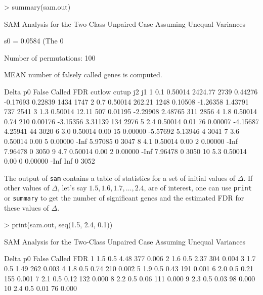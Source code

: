 \documentclass[a4paper]{article}
\begin{document}
\begin{Schunk}
\begin{Sinput}
> summary(sam.out)
\end{Sinput}
\begin{Soutput}
SAM Analysis for the Two-Class Unpaired Case Assuming Unequal Variances 
 
 s0 = 0.0584  (The 0 %
 
 Number of permutations: 100  

 MEAN number of falsely called genes is computed.

   Delta      p0   False Called     FDR   cutlow   cutup   j2   j1
1    0.1 0.50014 2424.77   2739 0.44276 -0.17693 0.22839 1434 1747
2    0.7 0.50014  262.21   1248 0.10508 -1.26358 1.43791  737 2541
3    1.3 0.50014   12.11    507 0.01195 -2.29908 2.48765  311 2856
4    1.8 0.50014    0.74    210 0.00176 -3.15356 3.31139  134 2976
5    2.4 0.50014    0.01     76 0.00007 -4.15687 4.25941   44 3020
6    3.0 0.50014    0.00     15 0.00000 -5.57692 5.13946    4 3041
7    3.6 0.50014    0.00      5 0.00000     -Inf 5.97085    0 3047
8    4.1 0.50014    0.00      2 0.00000     -Inf 7.96478    0 3050
9    4.7 0.50014    0.00      2 0.00000     -Inf 7.96478    0 3050
10   5.3 0.50014    0.00      0 0.00000     -Inf     Inf    0 3052
\end{Soutput}
\end{Schunk}

The output of \texttt{sam} contains a table of statistics for a set of initial values
of $\Delta$. If other values of $\Delta$, let's say $1.5, 1.6, 1.7, \ldots,
2.4$, are of interest, one can use \texttt{print} or \texttt{summary} to get the number
of significant genes and the estimated FDR for these values of $\Delta$.

\begin{Schunk}
\begin{Sinput}
> print(sam.out, seq(1.5, 2.4, 0.1))
\end{Sinput}
\begin{Soutput}
SAM Analysis for the Two-Class Unpaired Case Assuming Unequal Variances 
 
   Delta  p0 False Called   FDR
1    1.5 0.5  4.48    377 0.006
2    1.6 0.5  2.37    304 0.004
3    1.7 0.5  1.49    262 0.003
4    1.8 0.5  0.74    210 0.002
5    1.9 0.5  0.43    191 0.001
6    2.0 0.5  0.21    155 0.001
7    2.1 0.5  0.12    132 0.000
8    2.2 0.5  0.06    111 0.000
9    2.3 0.5  0.03     98 0.000
10   2.4 0.5  0.01     76 0.000
\end{Soutput}
\end{Schunk}
\end{document}

